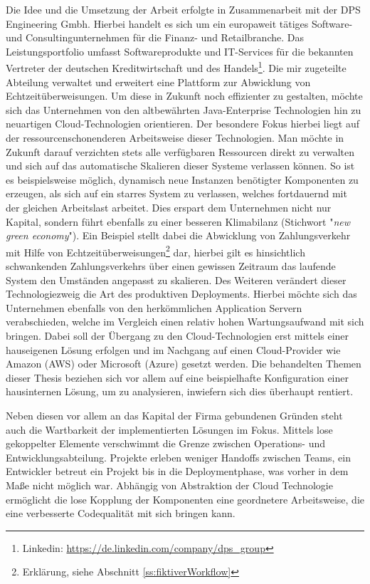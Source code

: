 Die Idee und die Umsetzung der Arbeit erfolgte in Zusammenarbeit mit der DPS Engineering Gmbh. Hierbei handelt es sich um ein europaweit tätiges Software- und Consultingunternehmen für die Finanz- und Retailbranche. Das Leistungsportfolio umfasst Softwareprodukte und IT-Services für die bekannten Vertreter der deutschen Kreditwirtschaft und des Handels\footnote{Linkedin: \url{https://de.linkedin.com/company/dps_group}}. Die mir zugeteilte Abteilung verwaltet und erweitert eine Plattform zur Abwicklung von Echtzeitüberweisungen. Um diese in Zukunft noch effizienter zu gestalten, möchte sich das Unternehmen von den altbewährten Java-Enterprise Technologien hin zu neuartigen Cloud-Technologien orientieren. Der besondere Fokus hierbei liegt auf der ressourcenschonenderen Arbeitsweise dieser Technologien. Man möchte in Zukunft darauf verzichten stets alle verfügbaren Ressourcen direkt zu verwalten und sich auf das automatische Skalieren dieser Systeme verlassen können. So ist es beispielsweise möglich, dynamisch neue Instanzen benötigter Komponenten zu erzeugen, als sich auf ein starres System zu verlassen, welches fortdauernd mit der gleichen Arbeitslast arbeitet. Dies erspart dem Unternehmen nicht nur Kapital, sondern führt ebenfalls zu einer besseren Klimabilanz (Stichwort "\emph{new green economy}"). Ein Beispiel stellt dabei die Abwicklung von Zahlungsverkehr mit Hilfe von Echtzeitüberweisungen\footnote{Erklärung, siehe Abschnitt \ref{ss:fiktiverWorkflow}} dar, hierbei gilt es hinsichtlich schwankenden Zahlungsverkehrs über einen gewissen Zeitraum das laufende System den Umständen angepasst zu skalieren. Des Weiteren verändert dieser Technologiezweig die Art des produktiven Deployments. Hierbei möchte sich das Unternehmen ebenfalls von den herkömmlichen Application Servern verabschieden, welche im Vergleich einen relativ hohen Wartungsaufwand mit sich bringen. Dabei soll der Übergang zu den Cloud-Technologien erst mittels einer hauseigenen Lösung erfolgen und im Nachgang auf einen Cloud-Provider wie Amazon (AWS) oder Microsoft (Azure) gesetzt werden. Die behandelten Themen dieser Thesis beziehen sich vor allem auf eine beispielhafte Konfiguration einer hausinternen Lösung, um zu analysieren, inwiefern sich dies überhaupt rentiert. 

Neben diesen vor allem an das Kapital der Firma gebundenen Gründen steht auch die Wartbarkeit der implementierten Lösungen im Fokus. Mittels lose gekoppelter Elemente verschwimmt die Grenze zwischen Operations- und Entwicklungsabteilung. Projekte erleben weniger Handoffs zwischen Teams, ein Entwickler betreut ein Projekt bis in die Deploymentphase, was vorher in dem Maße nicht möglich war. Abhängig von Abstraktion der Cloud Technologie ermöglicht die lose Kopplung der Komponenten eine geordnetere Arbeitsweise, die eine verbesserte Codequalität mit sich bringen kann. 


